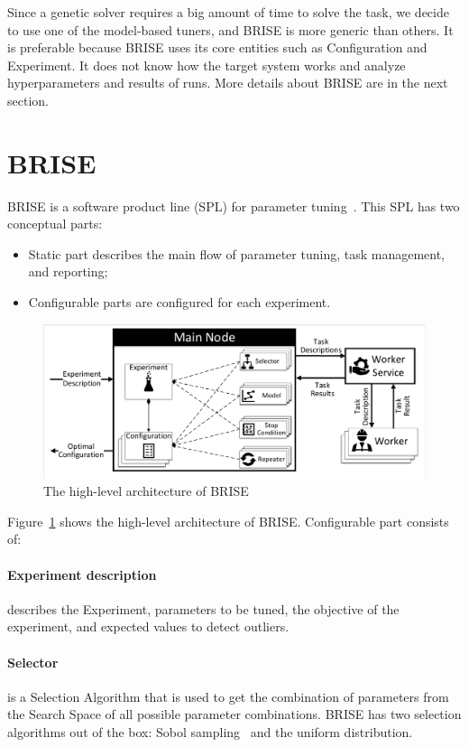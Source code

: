Since a genetic solver requires a big amount of time to solve the task, we decide to use one of the model-based tuners, and BRISE is more generic than others. It is preferable because BRISE uses its core entities such as Configuration and Experiment. It does not know how the target system works and analyze hyperparameters and results of runs. More details about BRISE are in the next section.


\section{BRISE}\label{sec:BRISE}

BRISE is a software product line (SPL) for parameter tuning~\cite{pukhkaiev19}.
This SPL has two conceptual parts:

\begin{itemize}
	\item Static part describes the main flow of parameter tuning, task management, and reporting;
	\item Configurable parts are configured for each experiment.
\end{itemize}

\begin{figure}
	\centering
	\includegraphics[width=\textwidth]{images/BRISEarch.pdf}
	\caption[The high-level architecture of BRISE]{The high-level architecture of BRISE}
	\label{fig:BRISEarch}
\end{figure}

Figure~\ref{fig:BRISEarch} shows the high-level architecture of BRISE.
Configurable part consists of:
\paragraph{Experiment description} describes the Experiment, parameters to be tuned, the objective of the experiment, and expected values to detect outliers.
\paragraph{Selector} is a Selection Algorithm that is used to get the combination of parameters from the Search Space of all possible parameter combinations. BRISE has two selection algorithms out of the box: Sobol sampling~\cite{sobol99} and the uniform distribution. 
